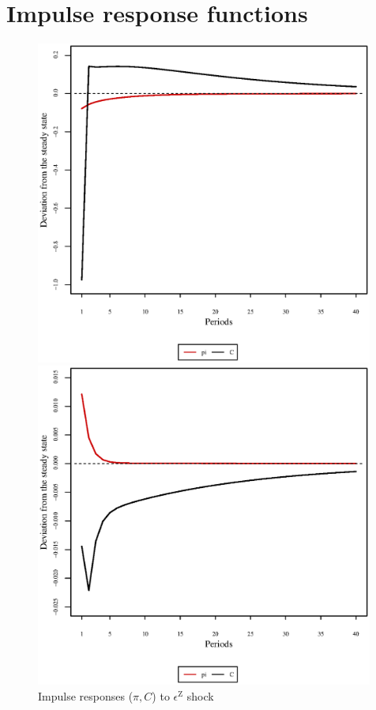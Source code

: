 \pagebreak

\section{Impulse response functions}

\begin{figure}[h]
\begin{minipage}{0.5\textwidth}
\vspace*{-3em}
\centering
\includegraphics[width=0.99\textwidth, scale=0.55]{plots/plot_81.eps}
\caption{Impulse responses ($\pi, C$) to $\epsilon^{\mathrm{Z}}$ shock}
\end{minipage}
\begin{minipage}{0.5\textwidth}
\vspace*{-3em}
\centering
\includegraphics[width=0.99\textwidth, scale=0.55]{plots/plot_82.eps}

\end{minipage}
\end{figure}
